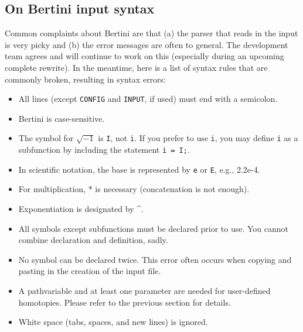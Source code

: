 \subsection{On Bertini input syntax}
Common complaints about Bertini are that (a) the parser that reads in the input is very picky and (b) the error messages are often to general. The development team agrees and will continue to work on this (especially during an upcoming complete rewrite). In the meantime, here is a list of syntax rules that are commonly broken, resulting in syntax errors:

\begin{itemize}
\item All lines (except \texttt{CONFIG} and \texttt{INPUT}, if used) must end with a semicolon.
\item Bertini is case-sensitive.
\item The symbol for $\sqrt{-1}$ is \texttt{I}, not \texttt{i}. If you prefer to use \texttt{i}, you may define \texttt{i} as a subfunction by
including the statement \texttt{i = I;}.
\item In scientific notation, the base is represented by \texttt{e} or {\tt E}, e.g., 2.2e-4. 
\item For multiplication, * is necessary (concatenation is not enough).
\item Exponentiation is designated by \string^.
\item All symbols except subfunctions must be declared prior to use.  You cannot combine declaration and definition, sadly.
\item No symbol can be declared twice. This error often occurs when copying and pasting in the
creation of the input file.
\item A pathvariable and at least one parameter are needed for user-defined homotopies. Please
refer to the previous section for details.
\item White space (tabs, spaces, and new lines) is ignored.
\end{itemize}
